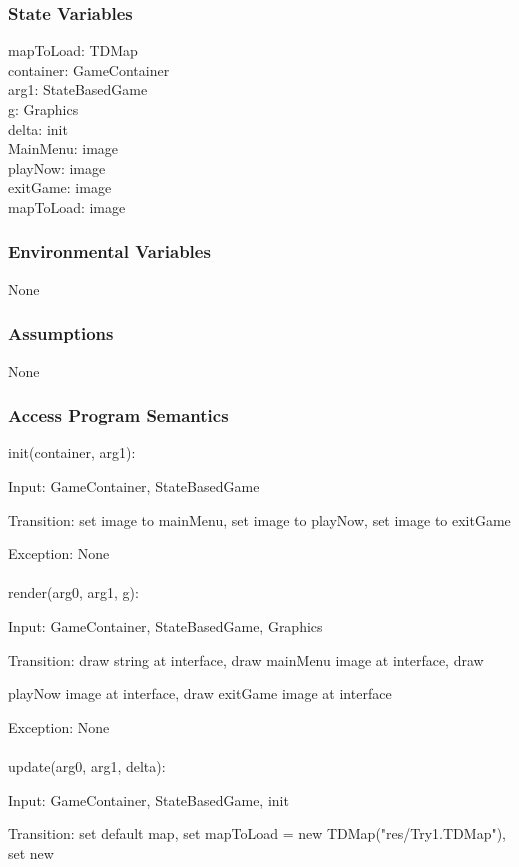 \documentclass[12,english]{article}
\begin{document}
		\subsubsection{State Variables}
		mapToLoad: TDMap\\
	    container: GameContainer\\
	    arg1: StateBasedGame\\
	    g: Graphics\\
	    delta: init\\
	    MainMenu: image\\
	    playNow: image\\
	    exitGame: image\\
	    mapToLoad: image\\
	    
		\subsubsection{Environmental Variables}
		None
		\subsubsection{Assumptions}
        None

		\subsubsection{Access Program Semantics}
		init(container, arg1):
		
		Input: GameContainer, StateBasedGame
		
		Transition: set image to mainMenu, set image to playNow, set image to exitGame
		
		Exception: None\\
		\\
		render(arg0, arg1, g):
		
		Input: GameContainer, StateBasedGame, Graphics
		
		Transition: draw string at interface, draw mainMenu image at interface, draw 
		
		playNow image at interface, draw exitGame image at interface
		
		Exception: None\\
		\\	
		update(arg0, arg1, delta):
		
		Input: GameContainer, StateBasedGame, init
		
		Transition: set default map, set mapToLoad = new TDMap("res/Try1.TDMap"), set new
		
\end{document}
